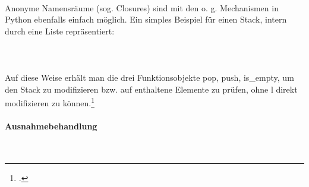 \\
Anonyme Namensräume (sog. Closures) sind mit den o. g. Mechanismen in Python ebenfalls einfach möglich. Ein simples Beispiel für einen Stack, intern durch eine Liste repräsentiert:\\
\\
\\
\\
Auf diese Weise erhält man die drei Funktionsobjekte pop, push, is\_empty, um den Stack zu modifizieren bzw. auf enthaltene Elemente zu prüfen, ohne l direkt modifizieren zu können.\footcite{python_wiki}\\

\paragraph{Ausnahmebehandlung}\ \\

